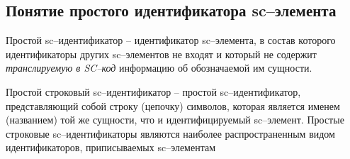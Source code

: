 \subsection{Понятие простого идентификатора sc--элемента}

Простой sc--идентификатор -- идентификатор sc--элемента, в состав которого идентификаторы других sc--элементов не входят и который не содержит \textit{транслируемую в SC--код} информацию об обозначаемой им сущности. 

Простой строковый sc--идентификатор -- простой sc--идентификатор, представляющий собой строку (цепочку) символов, которая является именем (названием) той же сущности, что и идентифицируемый sc--элемент. Простые строковые sc--идентификаторы являются наиболее распространенным видом идентификаторов, приписываемых sc--элементам

